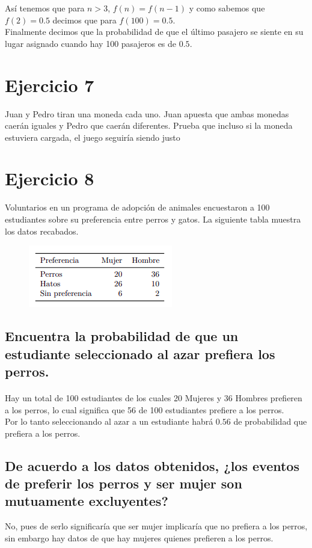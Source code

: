 \documentclass[12pt]{article}
\begin{document}
Así tenemos que para $n>3$, $f(n) = f(n-1)$ y como sabemos que $f(2)=0.5$ decimos que para $f(100) = 0.5$.\\
Finalmente decimos que la probabilidad de que el último pasajero se siente en su lugar asignado cuando hay 100 pasajeros es de $0.5$.
\section{Ejercicio 7}
Juan y Pedro tiran una moneda cada uno. Juan apuesta que ambas monedas caerán iguales
y Pedro que caerán diferentes. Prueba que incluso si la moneda estuviera cargada, el juego
seguiría siendo justo\\
\pagebreak
\section{Ejercicio 8} 
 Voluntarios en un programa de adopción de animales encuestaron a 100 estudiantes sobre su
preferencia entre perros y gatos. La siguiente tabla muestra los datos recabados.\\
\begin{figure}[h]
	\begin{center}
		\includegraphics[scale=0.85]{table}
	\end{center}
\end{figure}
\subsection{Encuentra la probabilidad de que un estudiante seleccionado al azar prefiera los perros.}
\paragraph{} Hay un total de 100 estudiantes de los cuales 20 Mujeres y 36 Hombres prefieren a los perros, lo cual significa que 56 de 100 estudiantes prefiere a los perros.\\
Por lo tanto seleccionando al azar a un estudiante habrá $0.56$ de probabilidad que prefiera a los perros. 
\subsection{De acuerdo a los datos obtenidos, ¿los eventos de preferir los perros y ser mujer son mutuamente excluyentes?}
No, pues de serlo significaría que ser mujer implicaría que no prefiera a los perros, sin embargo hay datos de que hay mujeres quienes prefieren a los perros.
\end{document}
